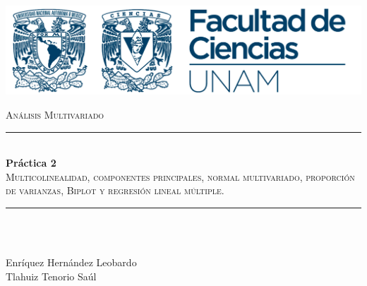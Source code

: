 \documentclass[
]{article}
\author{}
\date{\vspace{-2.5em}}
\begin{document}
\begin{titlepage}
	
	\newcommand{\HRule}{\rule{\linewidth}{0.5mm}} %
	
	\center %
	
	\includegraphics[]{logoFC_UNAM.png}\\ %
	
	\hspace*{2cm}

	\textsc{\large  Análisis Multivariado}\\[1.5cm] 
	
	
	\HRule \\[0.4cm]
	{ \Large \bfseries Práctica 2}\\[0.4cm] %
	\textsc{\Large Multicolinealidad, componentes principales, normal multivariado, proporción de varianzas, Biplot y regresión lineal múltiple.}\\[1cm] %
	\HRule \\[1.2cm]
	
	
	\begin{minipage}{0.4\textwidth}
		\begin{flushleft} \large
			\emph{}\\
Enríquez Hernández Leobardo\\
Tlahuiz Tenorio Saúl \\
		\end{flushleft}
	\end{minipage}
	~


\end{titlepage}
\end{document}
